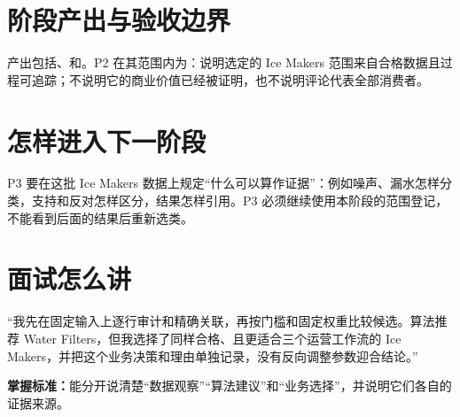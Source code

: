 \section{阶段产出与验收边界}

产出包括、和。P2 在其范围内为\statuspassed：说明选定的 Ice Makers 范围来自合格数据且过程可追踪；不说明它的商业价值已经被证明，也不说明评论代表全部消费者。

\section{怎样进入下一阶段}

P3 要在这批 Ice Makers 数据上规定“什么可以算作证据”：例如噪声、漏水怎样分类，支持和反对怎样区分，结果怎样引用。P3 必须继续使用本阶段的范围登记，不能看到后面的结果后重新选类。

\section{面试怎么讲}

\begin{interviewbox}
“我先在固定输入上逐行审计和精确关联，再按门槛和固定权重比较候选。算法推荐 Water Filters，但我选择了同样合格、且更适合三个运营工作流的 Ice Makers，并把这个业务决策和理由单独记录，没有反向调整参数迎合结论。”
\end{interviewbox}

\textbf{掌握标准：}能分开说清楚“数据观察”“算法建议”和“业务选择”，并说明它们各自的证据来源。

